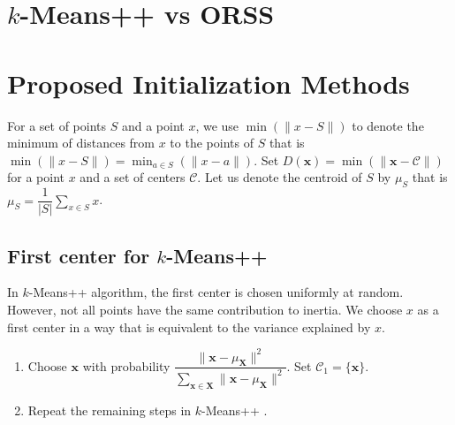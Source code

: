 \documentclass[twoside, 11pt]{article}
\newcommand{\x}{\mathbf{x}}
\newcommand{\X}{\mathbf{X}}
\newcommand{\C}{\mathcal{C}}
\begin{document}
	\section{$k$-Means++ vs ORSS}\label{sec:kmeans++vsorss}
	\section{Proposed Initialization Methods}
	For a set of points $S$ and a point $x$, we use $\min(\|x-S\|)$ to denote the minimum of distances from $x$ to the points of $S$ that is $\min(\| x-S\|)=\min_{a\in S}(\| x-a\|)$. Set $D(\x)=\min(\|\x-\C\|)$ for a point $x$ and a set of centers $\C$. Let us denote the centroid of $S$ by $\mu_S$ that is $\mu_S=\dfrac{1}{|S|}\sum_{x\in S}x$.
	\subsection{First center for $k$-Means++}\label{sec:first_center}
	In $k$-Means++ algorithm, the first center is chosen uniformly at random. However, not all points have the same contribution to inertia. We choose $x$ as a first center in a way that is equivalent to the variance explained by $x$.
	\begin{enumerate}[i]
		\item Choose $\x$ with probability $\dfrac{\|\x-\mu_{\X}\|^2}{\sum_{\x\in\X}\|\x-\mu_{\X}\|^2}$. Set $\C_1=\{\x\}$.\label{step:first_center}
		\item Repeat the remaining steps in $k$-Means++ \cite[Section $2.2$, Page $3$]{kmeans++}.
	\end{enumerate}
\end{document}
